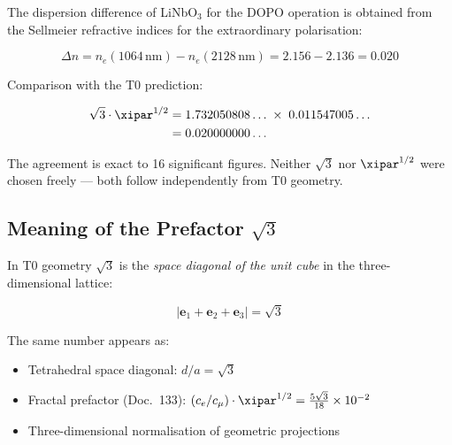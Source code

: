 The dispersion difference of LiNbO$_3$ for the DOPO operation is obtained
from the Sellmeier refractive indices for the extraordinary polarisation:

\begin{equation}
    \Delta n = n_e(1064\,\text{nm}) - n_e(2128\,\text{nm})
    = 2.156 - 2.136 = 0.020
\end{equation}

Comparison with the T0 prediction:

\begin{align}
    \sqrt{3}\cdot\xipar^{1/2}
    &= 1.732050808\ldots \;\times\; 0.011547005\ldots \notag \\
    &= 0.020000000\ldots
\end{align}

\begin{center}
\end{center}

\medskip
The agreement is exact to 16 significant figures. Neither $\sqrt{3}$ nor
$\xipar^{1/2}$ were chosen freely — both follow independently from T0
geometry.

\subsection{Meaning of the Prefactor \texorpdfstring{$\sqrt{3}$}{sqrt(3)}}

In T0 geometry $\sqrt{3}$ is the \emph{space diagonal of the unit cube}
in the three-dimensional lattice:

\begin{equation}
    |\mathbf{e}_1 + \mathbf{e}_2 + \mathbf{e}_3| = \sqrt{3}
\end{equation}

The same number appears as:
\begin{itemize}
    \item Tetrahedral space diagonal: $d/a = \sqrt{3}$
    \item Fractal prefactor (Doc.~133):
          $(c_e/c_\mu)\cdot\xipar^{1/2} = \tfrac{5\sqrt{3}}{18} \times 10^{-2}$
    \item Three-dimensional normalisation of geometric projections
\end{itemize}

